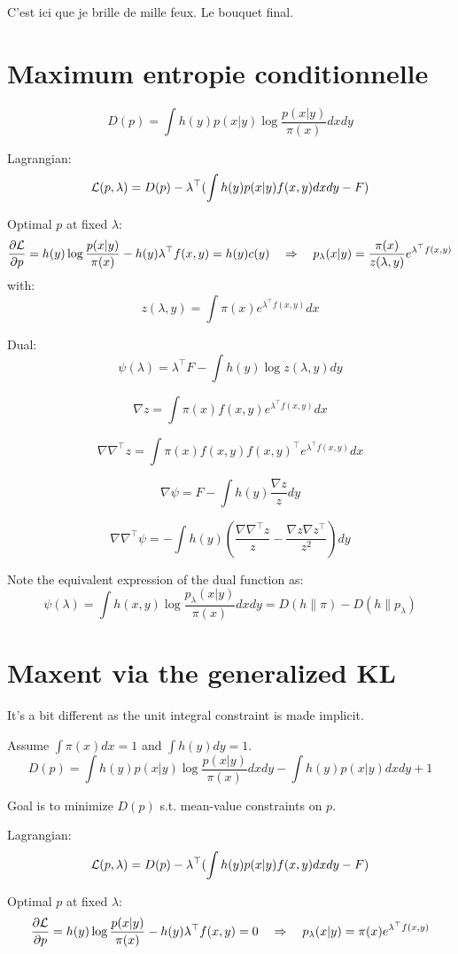 \documentclass{article}
\begin{document}
C'est ici que je brille de mille feux. Le bouquet final.


\section{Maximum entropie conditionnelle}

$$
D(p) = \int h(y)p(x|y) \log \frac{p(x|y)}{\pi(x)} dxdy
$$

Lagrangian:
$$
{\cal L}(p,\lambda) = D(p) -\lambda^\top (\int h(y)p(x|y)f(x,y)dxdy - F)
$$

Optimal $p$ at fixed $\lambda$:
$$
\frac{\partial{\cal L}}{\partial p}
=
h(y) \log \frac{p(x|y)}{\pi(x)} - h(y) \lambda^\top f(x,y)
= h(y) c(y)
\quad
\Rightarrow
\quad
p_{\lambda}(x|y) = \frac{\pi(x)}{z(\lambda,y)} e^{\lambda^\top f(x,y)}
$$
with:
$$
z(\lambda,y) = \int \pi(x) e^{\lambda^\top f(x,y)} dx
$$

Dual:
$$
\psi(\lambda) = \lambda^\top F - \int h(y) \log z(\lambda, y) dy 
$$

$$
\nabla z
=
\int \pi(x) f(x,y)  e^{\lambda^\top f(x,y)} dx
$$

$$
\nabla \nabla^\top z 
=
\int \pi(x) f(x,y) f(x,y)^\top e^{\lambda^\top f(x,y)} dx
$$

$$
\nabla\psi
= F - \int h(y) \frac{\nabla z}{z} dy
$$

$$
\nabla\nabla^\top\psi
= - \int h(y) \left(
\frac{\nabla \nabla^\top z}{z} 
-
\frac{\nabla z \nabla z^\top}{z^2}
\right)
dy
$$

Note the equivalent expression of the dual function as:
$$
\psi(\lambda)
=
\int h(x,y) \log \frac{p_\lambda(x|y)}{\pi(x)} dx dy
= D(h\|\pi) - D(h\|p_\lambda)
$$


\section{Maxent via the generalized KL}

It's a bit different as the unit integral constraint is made implicit.

Assume $\int\pi(x)dx=1$ and $\int h(y) dy = 1$. 
$$
D(p) 
= \int h(y)p(x|y) \log \frac{p(x|y)}{\pi(x)} dxdy
- \int h(y)p(x|y)dx dy
+ 1
$$

Goal is to minimize $D(p)$ s.t. mean-value constraints on $p$. 

Lagrangian:
$$
{\cal L}(p,\lambda) = D(p) -\lambda^\top (\int h(y)p(x|y)f(x,y)dxdy - F)
$$

Optimal $p$ at fixed $\lambda$:
$$
\frac{\partial{\cal L}}{\partial p}
=
h(y) \log \frac{p(x|y)}{\pi(x)} - h(y) \lambda^\top f(x,y)
= 0
\quad
\Rightarrow
\quad
p_{\lambda}(x|y) = \pi(x) e^{\lambda^\top f(x,y)}
$$
\end{document}
